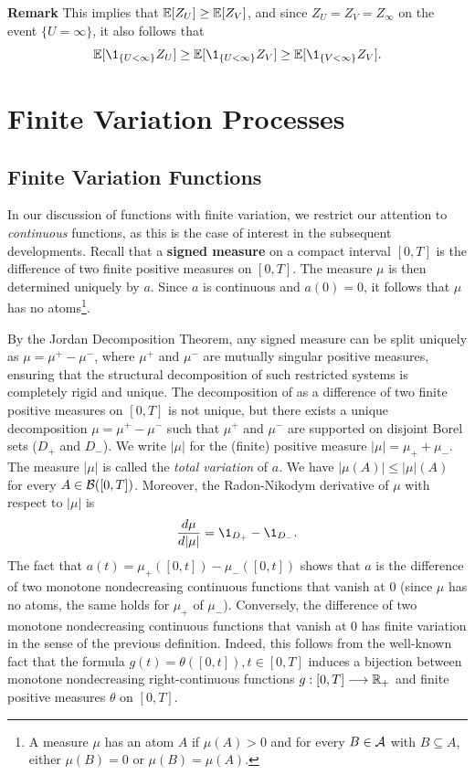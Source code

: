 \documentclass[../Main.tex]{subfiles}
\begin{document}
\textbf{Remark} 
This implies that $\mathbb{E}[Z_U] \ge \mathbb{E}[Z_V]$, and since $Z_U = Z_V = Z_\infty$ on the event $\{U = \infty\}$, it also follows that
\[
\EE[\1_{\{U < \infty\}} Z_U]
\ge
\EE[\1_{\{U < \infty\}} Z_V]
\ge
\EE[\1_{\{V < \infty\}} Z_V].
\]



\section{Finite Variation Processes} \label{sec:finite-variation-processes}
\subsection{Finite Variation Functions}
In our discussion of functions with finite variation, we restrict our attention to \textit{continuous} functions, as this is the case of interest in the subsequent developments. Recall that a \textbf{signed measure} on a compact interval $[0, T]$ is the difference of two finite positive measures on $[0, T]$.
The measure $\mu$ is then determined uniquely by $a$. Since $a$ is continuous and $a(0) = 0$, it follows that $\mu$ has no atoms\footnote{A measure $\mu$ has an atom $A$ if $\mu(A) > 0$ and for every $B \in \mathcal{A}$ with $B \subseteq A$, either $\mu(B) = 0$ or $\mu(B) = \mu(A)$.}.

By the Jordan Decomposition Theorem, any signed measure can be split uniquely as $\mu = \mu^+ - \mu^-$, where $\mu^+$ and $\mu^-$ are mutually singular positive measures, ensuring that the structural decomposition of such restricted systems is completely rigid and unique.
The decomposition of as a difference of two ﬁnite positive measures on $[0, T]$
is not unique, but there exists a unique decomposition $\mu = \mu^+ - \mu^-$ such that  $\mu^+$ and $\mu^-$ are supported on disjoint Borel sets ($D_+$ and $D_-$).
We write $|\mu|$ for the (finite) positive measure $|\mu| = \mu_+ + \mu_-$. The measure $|\mu|$ is called the \textit{total variation} of $a$. We have $|\mu(A)| \leq |\mu|(A)$ for every $A \in \mathcal{B}([0, T])$. Moreover, the Radon-Nikodym derivative of $\mu$ with respect to $|\mu|$ is
\[ \frac{d\mu}{d|\mu|} = \1_{D_+} - \1_{D_-}.\]
The fact that $a(t) = \mu_+([0, t]) - \mu_-([0, t])$ shows that $a$ is the difference of two monotone nondecreasing continuous functions that vanish at 0 (since $\mu$ has no atoms, the same holds for $\mu_+$ of $\mu_-$). Conversely, the difference of two monotone nondecreasing continuous functions that vanish at $0$ has finite variation in the sense of the previous definition. Indeed, this follows from the well-known fact that the formula $g(t) = \theta([0, t]), t \in [0, T]$ induces a bijection between monotone nondecreasing right-continuous functions $g : [0, T] \longrightarrow \mathbb{R}_+$ and finite positive measures $\theta$ on $[0, T]$.
\end{document}
